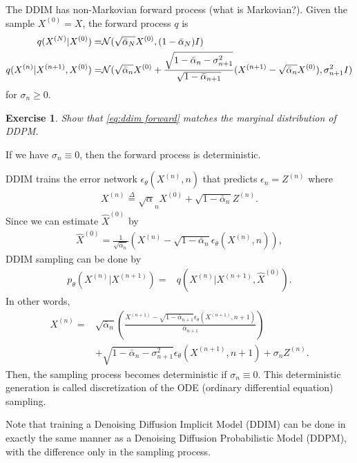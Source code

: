 \documentclass[11pt]{article}
\newtheorem{exercise}{Exercise}
\begin{document}
The DDIM has non-Markovian forward process (what is Markovian?).
Given the sample $X^{(0)}=X$, the forward process $q$ is
\begin{align}
    q(X^{(N)}|X^{(0)}) =&  {\cal N}(\sqrt{\bar{\alpha}_N} X^{(0)}, (1-\bar{\alpha}_N)I)\\
    q(X^{(n)}|X^{(n+1)}, X^{(0)}) =& {\cal N}(\sqrt{\bar{\alpha}_n} X^{(0)} + \frac{\sqrt{1-\bar{\alpha}_n 
    - \sigma_{n+1}^2}}{\sqrt{1-\bar{\alpha}_{n+1}}} (X^{(n+1)}-\sqrt{\bar{\alpha}_n} X^{(0)}), \sigma_{n+1}^2 I)\label{eq:ddim forward}
\end{align}
for $\sigma_n\geq 0$.
\begin{exercise}
    Show that \eqref{eq:ddim forward} matches the marginal distribution of DDPM.
\end{exercise}
If we have $\sigma_n \equiv 0$, then the forward process is deterministic.

DDIM trains the error network $\epsilon_{\theta}(X^{(n)}, n)$ that predicts $\epsilon_n=Z^{(n)}$ where
\begin{align}
    X^{(n)} \stackrel{\Delta}{=} \sqrt{\alpha}_n X^{(0)} + \sqrt{1-\bar{\alpha}_n} Z^{(n)}.
\end{align}
Since we can estimate $\hat{X}^{(0)}$ by
\begin{align}
    \hat{X}^{(0)} = \frac{1}{\sqrt{\bar{\alpha}_n}} (X^{(n)} - \sqrt{1-\bar{\alpha}_n} \epsilon_{\theta}(X^{(n)}, n)),
\end{align}
DDIM sampling can be done by
\begin{align}
    p_{\theta}(X^{(n)}|X^{(n+1)}) =& q(X^{(n)}|X^{(n+1)}, \hat{X}^{(0)}).
\end{align}
In other words,
\begin{align}
    X^{(n)} =& \sqrt{\bar{\alpha}_{n}} \left(\frac{X^{(n+1)} - \sqrt{1-\bar{\alpha}_{n+1}} \epsilon_{\theta} (X^{(n+1)}, n+1)}{\bar{\alpha}_{n+1}}\right) \nonumber\\
    &+ \sqrt{1-\bar{\alpha}_n - \sigma^2_{n+1}} \epsilon_{\theta}(X^{(n+1)}, n+1) + \sigma_n Z^{(n)}.
\end{align}
Then, the sampling process becomes deterministic if $\sigma_n\equiv 0$.
This deterministic generation is called discretization of the ODE (ordinary differential equation) sampling.

Note that training a Denoising Diffusion Implicit Model (DDIM) can be done in exactly the same manner 
as a Denoising Diffusion Probabilistic Model (DDPM), with the difference only in the sampling process.
\end{document}
